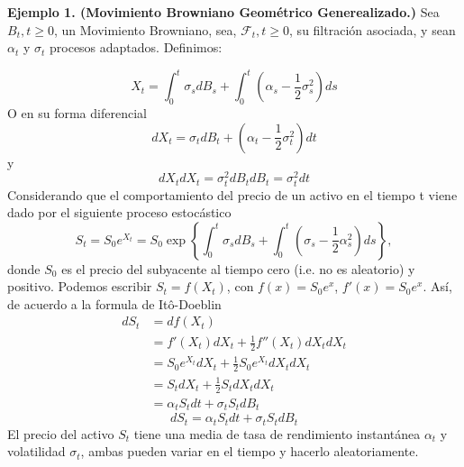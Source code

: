 \documentclass[11pt,notitlepage]{article}
\begin{document}
\textbf{Ejemplo 1. (Movimiento Browniano Geométrico Generealizado.)}  Sea $B_{t}, t \geq 0$,
 un Movimiento Browniano, sea, $\mathcal{F}_{t}, t \geq 0$, su filtración asociada, y sean $\alpha_{t}$ y $\sigma_{t}$ procesos adaptados. Definimos:

\begin{equation*}
    X_t= \int_{0}^{t} \sigma_{s}dB_{s}+\int_{0}^{t}\left ( \alpha_{s}-\frac{1}{2}\sigma^{2}_{s} \right ) ds
\end{equation*}
O en su forma diferencial
\begin{equation*}
     dX_t=\sigma_{t}dB_{t}+\left ( \alpha_{t}-\frac{1}{2}\sigma^{2}_{t} \right )dt
\end{equation*}
y
\begin{equation*}
    dX_{t}dX_{t}=\sigma^{2}_{t}dB_{t}dB_{t}=\sigma^{2}_{t}dt
\end{equation*}
Considerando que el comportamiento del precio de un activo en el tiempo t viene dado por el siguiente proceso estocástico
\begin{equation*}
    S_{t}=S_{0}e^{X_{t}}=S_{0}\exp\left \{ \int_{0}^{t}\sigma_{s}dB_{s}+\int_{0}^{t}\left ( \sigma_{s}-\frac{1}{2}\alpha^{2}_{s} \right )ds \right \},
\end{equation*}
donde $S_{0}$ es el precio del subyacente al tiempo cero (i.e. no es aleatorio) y positivo. Podemos escribir $S_{t}=f(X_{t})$, con $f(x)=S_{0}e^{x}$, $f'(x)=S_{0}e^{x}$. Así, de acuerdo a la formula de Itô-Doeblin
\begin{align*}
    dS_{t}&=df(X_{t})\\
    &=f'(X_{t})dX_{t}+\frac{1}{2}f''(X_{t})dX_{t}dX_{t}\\
    &=S_{0}e^{X_{t}}dX_{t}+\frac{1}{2}S_{0}e^{X_{t}}dX_{t}dX_{t}\\
    &=S_{t}dX_{t}+\frac{1}{2}S_{t}dX_{t}dX_{t}\\
    &=\alpha_{t}S_{t}dt+\sigma_{t}S_{t}dB_{t}
\end{align*}
\begin{equation}\label{secc2.3_StDiff}
    dS_{t}=\alpha_{t}S_{t}dt+\sigma_{t}S_{t}dB_{t}
\end{equation}
El precio del activo $S_{t}$ tiene una media de tasa de rendimiento instantánea $\alpha_{t}$ y volatilidad $\sigma_{t}$, ambas pueden variar en el tiempo y hacerlo aleatoriamente.\\
\end{document}
